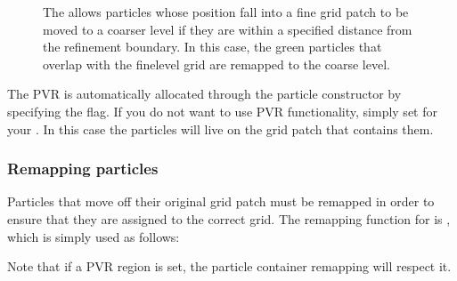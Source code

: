 \documentclass[letterpaper,10pt,english]{sphinxmanual}
\let\sphinxpxdimen\pdfpxdimen\else\newdimen\sphinxpxdimen
\begin{document}
\begin{figure}[htb]
\centering
\capstart

\noindent\sphinxincludegraphics[width=360\sphinxpxdimen]{{ParticleValidRegion}.png}
\caption{The  allows particles whose position fall into a fine grid patch to be moved to a coarser level if they are within a specified distance from the refinement boundary.
In this case, the green particles that overlap with the fine\sphinxhyphen{}level grid are remapped to the coarse level.}\label{\detokenize{Source/Particles:id3}}\end{figure}

The PVR is automatically allocated through the particle constructor by specifying the  flag.
If you do not want to use PVR functionality, simply set  for your .
In this case the particles will live on the grid patch that contains them.


\subsubsection{Remapping particles}
\label{\detokenize{Source/Particles:remapping-particles}}
Particles that move off their original grid patch must be remapped in order to ensure that they are assigned to the correct grid.
The remapping function for  is , which is simply used as follows:

\begin{sphinxVerbatim}[commandchars=\\\{\},formatcom=\scriptsize]
 

\end{sphinxVerbatim}

Note that if a PVR region is set, the particle container remapping will respect it.
\end{document}

